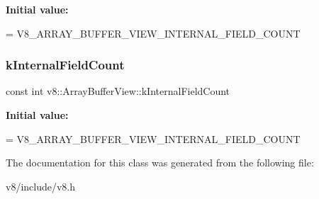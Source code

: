 {\bfseries Initial value\+:}
\begin{DoxyCode}
=
      V8\_ARRAY\_BUFFER\_VIEW\_INTERNAL\_FIELD\_COUNT
\end{DoxyCode}
\mbox{\label{classv8_1_1ArrayBufferView_a1cccb675b1a91e61411fee5918d451db}} 
\subsubsection{\texorpdfstring{k\+Internal\+Field\+Count}{kInternalFieldCount}}
{\footnotesize\ttfamily const int v8\+::\+Array\+Buffer\+View\+::k\+Internal\+Field\+Count\hspace{0.3cm}{\ttfamily [static]}}

{\bfseries Initial value\+:}
\begin{DoxyCode}
=
      V8\_ARRAY\_BUFFER\_VIEW\_INTERNAL\_FIELD\_COUNT
\end{DoxyCode}


The documentation for this class was generated from the following file\+:\begin{DoxyCompactItemize}
\item 
v8/include/v8.\+h\end{DoxyCompactItemize}
